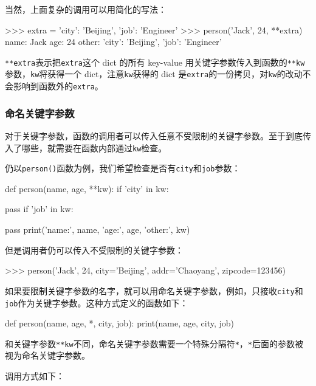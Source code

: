 当然，上面复杂的调用可以用简化的写法：

\begin{pythoncode}
>>> extra = {'city': 'Beijing', 'job': 'Engineer'}
>>> person('Jack', 24, **extra)
name: Jack age: 24 other: {'city': 'Beijing', 'job': 'Engineer'}
\end{pythoncode}

\texttt{**extra}表示把\texttt{extra}这个 dict 的所有 key-value
用关键字参数传入到函数的\texttt{**kw}参数，\texttt{kw}将获得一个
dict，注意\texttt{kw}获得的 dict
是\texttt{extra}的一份拷贝，对\texttt{kw}的改动不会影响到函数外的\texttt{extra}。

\hypertarget{ux547dux540dux5173ux952eux5b57ux53c2ux6570}{%
\subsubsection{命名关键字参数}\label{ux547dux540dux5173ux952eux5b57ux53c2ux6570}}

对于关键字参数，函数的调用者可以传入任意不受限制的关键字参数。至于到底传入了哪些，就需要在函数内部通过\texttt{kw}检查。

仍以\texttt{person()}函数为例，我们希望检查是否有\texttt{city}和\texttt{job}参数：

\begin{pythoncode}
def person(name, age, **kw):
    if 'city' in kw:
        
        pass
    if 'job' in kw:
        
        pass
    print('name:', name, 'age:', age, 'other:', kw)
\end{pythoncode}

但是调用者仍可以传入不受限制的关键字参数：

\begin{pythoncode}
>>> person('Jack', 24, city='Beijing', addr='Chaoyang', zipcode=123456)
\end{pythoncode}

如果要限制关键字参数的名字，就可以用命名关键字参数，例如，只接收\texttt{city}和\texttt{job}作为关键字参数。这种方式定义的函数如下：

\begin{pythoncode}
def person(name, age, *, city, job):
    print(name, age, city, job)
\end{pythoncode}

和关键字参数\texttt{**kw}不同，命名关键字参数需要一个特殊分隔符\texttt{*}，\texttt{*}后面的参数被视为命名关键字参数。

调用方式如下：

